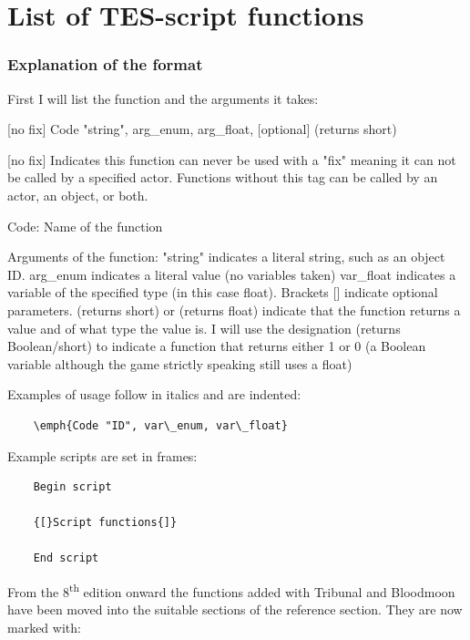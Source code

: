 \section{List of TES-script functions}

\hypertarget{explanation-of-the-format}{%
\subsubsection{Explanation of the
format}\label{explanation-of-the-format}}

First I will list the function and the arguments it takes:

	{[}no fix{]} Code "string", arg\_enum, arg\_float, {[}optional{]}
	(returns short)

{[}no fix{]} Indicates this function can never be used with a "fix"
meaning it can not be called by a specified actor. Functions without
this tag can be called by an actor, an object, or both.

Code: Name of the function

Arguments of the function: "string" indicates a literal string, such as
an object ID. arg\_enum indicates a literal value (no variables taken)
var\_float indicates a variable of the specified type (in this case
float). Brackets {[}{]} indicate optional parameters. (returns short) or
(returns float) indicate that the function returns a value and of what
type the value is. I will use the designation (returns Boolean/short) to
indicate a function that returns either 1 or 0 (a Boolean variable
although the game strictly speaking still uses a float)

Examples of usage follow in italics and are indented:

\begin{lstlisting}
	\emph{Code "ID", var\_enum, var\_float}
\end{lstlisting}
	
Example scripts are set in frames:

\begin{lstlisting}	
	Begin script
	
	{[}Script functions{]}
	
	End script
\end{lstlisting}

From the 8\textsuperscript{th} edition onward the functions added with
Tribunal and Bloodmoon have been moved into the suitable sections of the
reference section. They are now marked with:

